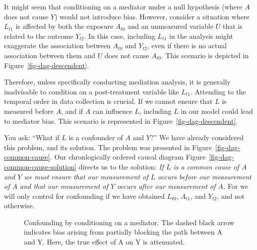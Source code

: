 \documentclass[
  singlecolumn,
  9pt]{article}
\begin{document}
It might seem that conditioning on a mediator under a null hypothesis
(where \(A\) does not cause \(Y\)) would not introduce bias. However,
consider a situation where \(L_{t1}\) is affected by both the exposure
\(A_{t0}\) and an unmeasured variable \(U\) that is related to the
outcome \(Y_{t2}\). In this case, including \(L_{t1}\) in the analysis
might exaggerate the association between \(A_{t0}\) and \(Y_{t2}\), even
if there is no actual association between them and \(U\) does not cause
\(A_{t0}\). This scenario is depicted in
Figure~\ref{fig-dag-descendent}.

Therefore, unless specifically conducting mediation analysis, it is
generally inadvisable to condition on a post-treatment variable like
\(L_{t1}\). Attending to the temporal order in data collection is
crucial. If we cannot ensure that \(L\) is measured before \(A\), and if
\(A\) can influence \(L\), including \(L\) in our model could lead to
mediator bias. This scenario is represented in
Figure~\ref{fig-dag-descendent}.

You ask: ``What if \(L\) is a confounder of \(A\) and \(Y\)?'' We have
already considered this problem, and its solution. The problem was
presented in Figure~\ref{fig-dag-common-cause}. Our chronlogically
ordered causal diagram Figure~\ref{fig-dag-common-cause-solution}
directs us to the solution: \emph{If \(L\) is a common cause of \(A\)
and \(Y\) we must ensure that our measurement of \(L\) occurs before our
measurement of \(A\) and that our measurement of \(Y\) occurs after our
measurement of \(A\).} For we will only control for confounding if we
have obtained \(L_{t0}\), \(A_{t1}\), and \(Y_{t2}\), and not otherwise.

\begin{figure}


\caption{\label{fig-dag-mediator}Confounding by conditioning on a
mediator. The dashed black arrow indicates bias arising from partially
blocking the path between A and Y. Here, the true effect of A on Y is
attenuated.}

\end{figure}%
\end{document}

